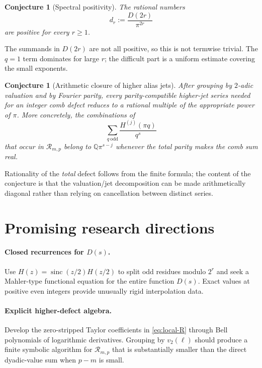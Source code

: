 \documentclass[11pt]{article}
\newtheorem{conjecture}[theorem]{Conjecture}
\theoremstyle{definition}
\theoremstyle{remark}
\newcommand{\sinc}{\operatorname{sinc}}
\newcommand{\Rema}{\mathcal R}
\begin{document}
\begin{conjecture}[Spectral positivity]\label{conj:positivity}
The rational numbers
\[
 d_r:=\frac{D(2r)}{\pi^{2r}}
\]
are positive for every $r\ge1$.
\end{conjecture}

The summands in $D(2r)$ are not all positive, so this is not termwise
trivial.  The $q=1$ term dominates for large $r$; the difficult part is a
uniform estimate covering the small exponents.

\begin{conjecture}[Arithmetic closure of higher alias jets]\label{conj:jets}
After grouping by $2$-adic valuation and by Fourier parity, every
parity-compatible higher-jet series needed for an integer comb defect reduces
to a rational multiple of the appropriate power of $\pi$.  More concretely,
the combinations of
\[
 \sum_{q\ \mathrm{odd}}\frac{H^{(j)}(\pi q)}{q^s}
\]
that occur in $\Rema_{m,p}$ belong to $\mathbb Q\pi^{s-j}$ whenever the total
parity makes the comb sum real.
\end{conjecture}

Rationality of the \emph{total} defect follows from the finite formula; the
content of the conjecture is that the valuation/jet decomposition can be made
arithmetically diagonal rather than relying on cancellation between distinct
series.

\section{Promising research directions}

\paragraph{Closed recurrences for $D(s)$.}
Use $H(z)=\sinc(z/2)H(z/2)$ to split odd residues modulo $2^r$ and seek a
Mahler-type functional equation for the entire function $D(s)$.  Exact values
at positive even integers provide unusually rigid interpolation data.

\paragraph{Explicit higher-defect algebra.}
Develop the zero-stripped Taylor coefficients in \eqref{eq:local-R} through
Bell polynomials of logarithmic derivatives.  Grouping by $v_2(\ell)$ should
produce a finite symbolic algorithm for $\Rema_{m,p}$ that is substantially
smaller than the direct dyadic-value sum when $p-m$ is small.
\end{document}
